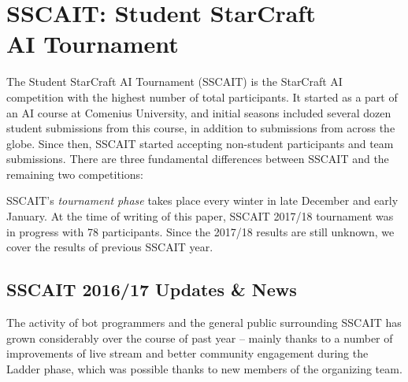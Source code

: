 \section{SSCAIT: Student StarCraft\\ AI Tournament}\label{subsecSSCAIT}

The Student StarCraft AI Tournament (SSCAIT) is the StarCraft AI competition with the highest number of total participants. It started as a part of an AI course at Comenius University, and initial seasons included several dozen student submissions from this course, in addition to submissions from across the globe. Since then, SSCAIT started accepting non-student participants and team submissions. There are three fundamental differences between SSCAIT and the remaining two competitions:

\vskip 3mm

SSCAIT's {\em tournament phase} takes place every winter in late December and early January. At the time of writing of this paper, SSCAIT 2017/18 tournament was in progress with 78 participants. Since the 2017/18 results are still unknown, we cover the results of previous SSCAIT year.

\subsection*{SSCAIT 2016/17 Updates \& News}\label{subsecSSCAITnews}

The activity of bot programmers and the general public surrounding SSCAIT has grown considerably over the course of past year -- mainly thanks to a number of improvements of live stream and better community engagement during the Ladder phase, which was possible thanks to new members of the organizing team.

